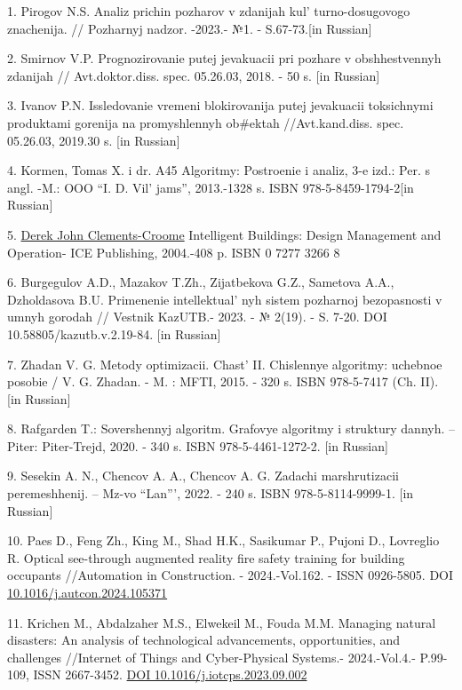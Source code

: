 \begin{references}
1. Pirogov N.S. Analiz prichin pozharov v zdanijah
kul' turno-dosugovogo znachenija. // Pozharnyj nadzor.
-2023.- №1. - S.67-73.{[}in Russian{]}

2. Smirnov V.P. Prognozirovanie putej jevakuacii pri pozhare v
obshhestvennyh zdanijah // Avt.doktor.diss. spec. 05.26.03, 2018. - 50
s. {[}in Russian{]}

3. Ivanov P.N. Issledovanie vremeni blokirovanija putej jevakuacii
toksichnymi produktami gorenija na promyshlennyh ob\#ektah
//Avt.kand.diss. spec. 05.26.03, 2019.30 s. {[}in Russian{]}

4. Kormen, Tomas X. i dr. A45 Algoritmy: Postroenie i analiz, 3-e izd.:
Per. s angl. -M.: OOO ``I. D. Vil' jams'', 2013.-1328 s.
ISBN 978-5-8459-1794-2{[}in Russian{]}

5. \href{https://www.researchgate.net/profile/Derek-Clements-Croome}{Derek
John Clements-Croome} Intelligent Buildings: Design Management and
Operation- ICE Publishing, 2004.-408 p. ISBN 0 7277 3266 8

6. Burgegulov A.D., Mazakov T.Zh., Zijatbekova G.Z., Sametova A.A.,
Dzholdasova B.U. Primenenie intellektual' nyh sistem
pozharnoj bezopasnosti v umnyh gorodah // Vestnik KazUTB.- 2023. - №
2(19). - S. 7-20. DOI 10.58805/kazutb.v.2.19-84. {[}in Russian{]}

7. Zhadan V. G. Metody optimizacii. Chast'{} II.
Chislennye algoritmy: uchebnoe posobie / V. G. Zhadan. - M. : MFTI,
2015. - 320 s. ISBN 978-5-7417 (Ch. II). {[}in Russian{]}

8. Rafgarden T.: Sovershennyj algoritm. Grafovye algoritmy i struktury
dannyh. -- Piter: Piter-Trejd, 2020. - 340 s. ISBN 978-5-4461-1272-2.
{[}in Russian{]}

9. Sesekin A. N., Chencov A. A., Chencov A. G. Zadachi marshrutizacii
peremeshhenij. -- Mz-vo ``Lan''', 2022. - 240 s. ISBN
978-5-8114-9999-1. {[}in Russian{]}

10. Paes D., Feng Zh., King M., Shad H.K., Sasikumar P., Pujoni D.,
Lovreglio R. Optical see-through augmented reality fire safety training
for building occupants //Automation in Construction. - 2024.-Vol.162. -
ISSN 0926-5805. DOI
\href{https://doi.org/10.1016/j.autcon.2024.105371}{10.1016/j.autcon.2024.105371}

11. Krichen M., Abdalzaher M.S., Elwekeil M., Fouda M.M. Managing
natural disasters: An analysis of technological advancements,
opportunities, and challenges //Internet of Things and Cyber-Physical
Systems.- 2024.-Vol.4.- P.99-109, ISSN 2667-3452.
\href{https://doi.org/10.1016/j.iotcps.2023.09.002}{DOI
10.1016/j.iotcps.2023.09.002}


\end{references}
